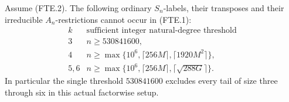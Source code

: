 \begin{proposition}[HD-FT16]
Assume (FTE.2).  The following ordinary \(S_n\)-labels, their
transposes and their irreducible \(A_n\)-restrictions cannot occur
in (FTE.1):
\[
 \begin{array}{c|c}
 k&\text{sufficient integer natural-degree threshold}\\ \hline
 3& n\ge530841600,\\
 4& n\ge\max\{10^6,\lceil256M\rceil,\lceil1920M^2\rceil\},\\
 5,6&n\ge\max\{10^6,\lceil256M\rceil,
                              \lceil\sqrt{288G}\rceil\}.
 \end{array}
 \tag{FTE.4}
\]
In particular the single threshold \(530841600\) excludes every
tail of size three through six in this actual factorwise setup.
\end{proposition}

